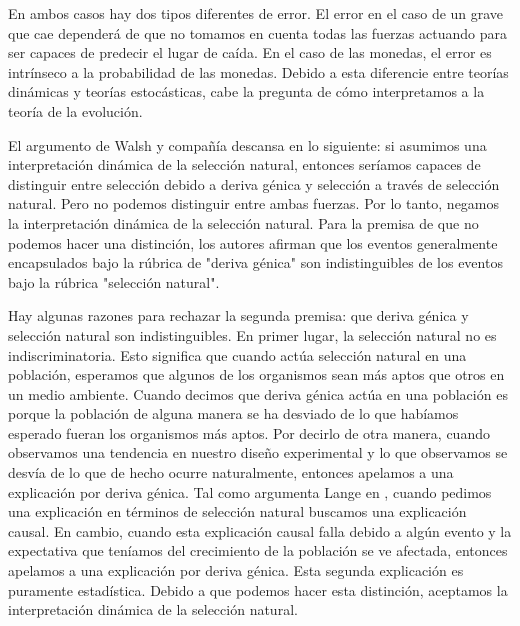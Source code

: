 En ambos casos hay dos tipos diferentes de error. El error en el caso de un grave que cae dependerá de que no tomamos en cuenta todas las fuerzas actuando para ser capaces de predecir el lugar de caída. En el caso de las monedas, el error es intrínseco a la probabilidad de las monedas. Debido a esta diferencie entre teorías dinámicas y teorías estocásticas, cabe la pregunta de cómo interpretamos a la teoría de la evolución.

El argumento de Walsh y compañía descansa en lo siguiente: si asumimos una interpretación dinámica de la selección natural, entonces seríamos capaces de distinguir entre selección debido a deriva génica y selección a través de selección natural. Pero no podemos distinguir entre ambas fuerzas. Por lo tanto, negamos la interpretación dinámica de la selección natural. Para la premisa de que no podemos hacer una distinción, los autores afirman que los eventos generalmente encapsulados bajo la rúbrica de "deriva génica" son indistinguibles de los eventos bajo la rúbrica "selección natural".

Hay algunas razones para rechazar la segunda premisa: que deriva génica y selección natural son indistinguibles. En primer lugar, la selección natural no es indiscriminatoria. Esto significa que cuando actúa selección natural en una población, esperamos que algunos de los organismos sean más aptos que otros en un medio ambiente. Cuando decimos que deriva génica actúa en una población es porque la población de alguna manera se ha desviado de lo que habíamos esperado fueran los organismos más aptos. Por decirlo de otra manera, cuando observamos una tendencia en nuestro diseño experimental y lo que observamos se desvía de lo que de hecho ocurre naturalmente, entonces apelamos a una explicación por deriva génica. Tal como argumenta Lange en \citeyear{Lange2013}, cuando pedimos una explicación en términos de selección natural buscamos una explicación causal. En cambio, cuando esta explicación causal falla debido a algún evento y la expectativa que teníamos del crecimiento de la población se ve afectada, entonces apelamos a una explicación por deriva génica. Esta segunda explicación es puramente estadística. Debido a que podemos hacer esta distinción, aceptamos la interpretación dinámica de la selección natural.

